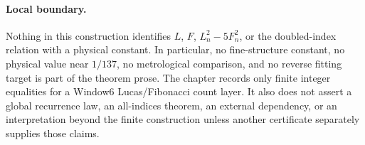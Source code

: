 \paragraph{Local boundary.}
Nothing in this construction identifies $L$, $F$, $L_n^2-5F_n^2$, or the doubled-index relation with a physical constant.  In particular, no fine-structure constant, no physical value near $1/137$, no metrological comparison, and no reverse fitting target is part of the theorem prose.  The chapter records only finite integer equalities for a Window6 Lucas/Fibonacci count layer.  It also does not assert a global recurrence law, an all-indices theorem, an external dependency, or an interpretation beyond the finite construction unless another certificate separately supplies those claims.
